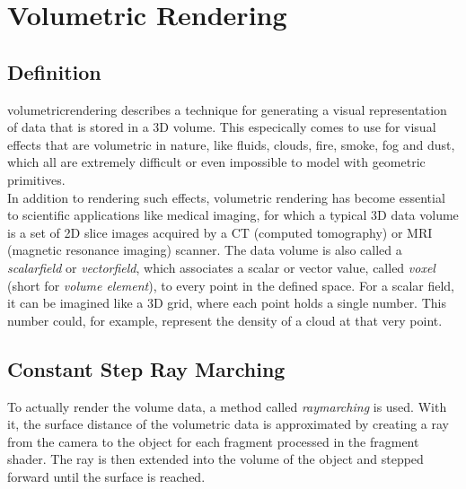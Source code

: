 \section{Volumetric Rendering}
\label{section:volumetric-rendering}

\subsection{Definition}
\Gls{volumetricrendering} describes a technique for generating a visual representation of data that is stored in a 3D volume. 
This especically comes to use for visual effects that are volumetric in nature, like fluids, clouds, fire, smoke, fog and dust, which all are extremely difficult or even impossible to model with geometric primitives.
\\
In addition to rendering such effects, volumetric rendering has become essential to scientific applications like medical imaging, for which a typical 3D data volume is a set of 2D slice images acquired by a CT (computed tomography) or MRI (magnetic resonance imaging) scanner.
\emptyline
The data volume is also called a \textit{\gls{scalarfield}} or \textit{\gls{vectorfield}}, which associates a scalar or vector value, called \textit{\gls{voxel}} (short for \textit{volume element}), to every point in the defined space.
For a scalar field, it can be imagined like a 3D grid, where each point holds a single number. This number could, for example, represent the density of a cloud at that very point.

\subsection{Constant Step Ray Marching}
To actually render the volume data, a method called \textit{\gls{raymarching}} is used. With it, the surface distance of the volumetric data is approximated by creating a ray from the camera to the object for each fragment processed in the fragment shader. The ray is then extended into the volume of the object and stepped forward until the surface is reached.

\begin{figure}[H]
    \centering
\end{figure}

